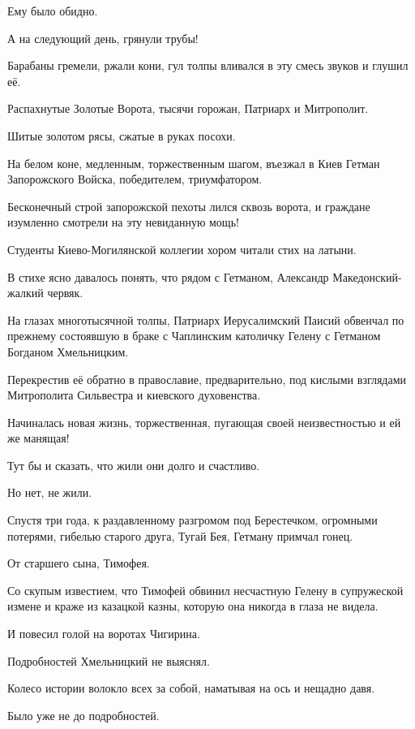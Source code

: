 Ему было обидно.

А на следующий день, грянули трубы!

Барабаны гремели, ржали кони, гул толпы вливался в эту смесь звуков и глушил её.

Распахнутые Золотые Ворота, тысячи горожан, Патриарх и Митрополит.

Шитые золотом рясы, сжатые в руках посохи.

На белом коне, медленным, торжественным шагом, въезжал в Киев Гетман
Запорожского Войска, победителем, триумфатором.

Бесконечный строй запорожской пехоты лился сквозь ворота, и граждане изумленно смотрели на эту невиданную мощь!

Студенты Киево-Могилянской коллегии хором читали стих на латыни.

В стихе ясно давалось понять, что рядом с Гетманом, Александр Македонский-жалкий червяк.

На глазах многотысячной толпы, Патриарх Иерусалимский Паисий обвенчал по прежнему состоявшую в браке с Чаплинским католичку Гелену с Гетманом Богданом Хмельницким.

Перекрестив её обратно в православие, предварительно, под кислыми взглядами
Митрополита Сильвестра и киевского духовенства.

Начиналась новая жизнь, торжественная, пугающая своей неизвестностью и ей же манящая!

Тут бы и сказать, что жили они долго и счастливо.

Но нет, не жили.

Спустя три года, к раздавленному разгромом под Берестечком, огромными потерями, гибелью старого друга, Тугай Бея, Гетману примчал гонец.

От старшего сына, Тимофея.

Со скупым известием, что Тимофей обвинил несчастную Гелену в супружеской измене
и краже из казацкой казны, которую она никогда в глаза не видела.

И повесил голой на воротах Чигирина.

Подробностей Хмельницкий не выяснял.

Колесо истории волокло всех за собой, наматывая на ось и нещадно давя.

Было уже не до подробностей.
